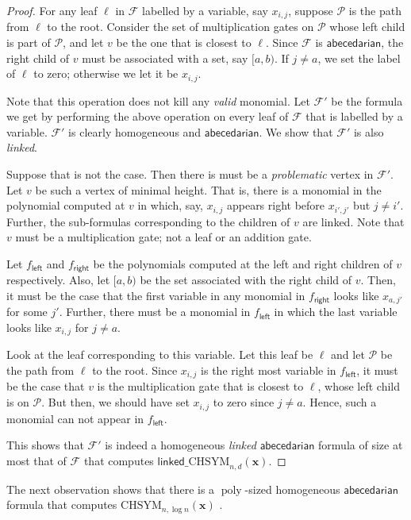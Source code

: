 \documentclass[10pt,a4paper]{article}
\def\poly{\operatorname{poly}}
\def\vecx{\mathbf{x}}
\newcommand{\form}{\textbf{$\mathcal{F}$}}
\renewcommand{\l}{\mathsf{left}}
\renewcommand{\r}{\mathsf{right}}
\newcommand{\abcd}{\mathsf{abecedarian}}
\newcommand{\chsym}[2]{\mathrm{CHSYM}_{#1,#2}}
\newcommand{\lchsym}[2]{\mathrm{\mathsf{linked}\_CHSYM}_{#1,#2}}
\begin{document}
\begin{proof}
	For any leaf $\ell$ in $\form$ labelled by a variable, say $x_{i,j}$, suppose $\mathcal{P}$ is the path from $\ell$ to the root. 
	Consider the set of multiplication gates on $\mathcal{P}$ whose left child is part of $\mathcal{P}$, and let $v$ be the one that is closest to $\ell$.
	Since $\form$ is $\abcd$, the right child of $v$ must be associated with a set, say $[a,b)$.
	If $j \neq a$, we set the label of $\ell$ to zero; otherwise we let it be $x_{i,j}$.
	
	Note that this operation does not kill any \emph{valid} monomial.
	Let $\form'$ be the formula we get by performing the above operation on every leaf of $\form$ that is labelled by a variable.
	$\form'$ is clearly 
	homogeneous and $\abcd$.
	We show that $\form'$ is also \emph{linked}.
	
	Suppose that is not the case.
	Then there is must be a \emph{problematic} vertex in $\form'$.
	Let $v$ be such a vertex of minimal height.
	That is, there is a monomial in the polynomial computed at $v$ in which, say, $x_{i,j}$ appears right before $x_{i',j'}$ but $j \neq i'$.
	Further, the sub-formulas corresponding to the children of $v$ are linked.
	Note that $v$ must be a multiplication gate; not a leaf or an addition gate.

	Let $f_\l$ and $f_\r$ be the polynomials computed at the left and right children of $v$ respectively.
	Also, let $[a,b)$ be the set associated with the right child of $v$.
	Then, it must be the case that the first variable in any monomial in $f_\r$ looks like $x_{a,j'}$ for some $j'$.
	Further, there must be a monomial in $f_\l$ in which the last variable looks like $x_{i,j}$ for $j \neq a$.
	
	Look at the leaf corresponding to this variable.
	Let this leaf be $\ell$ and let $\mathcal{P}$ be the path from $\ell$ to the root.
	Since $x_{i,j}$ is the right most variable in $f_\l$, it must be the case that $v$ is the multiplication gate that is closest to $\ell$, whose left child is on $\mathcal{P}$.
	But then, we should have set $x_{i,j}$ to zero since $j \neq a$.
	Hence, such a monomial can not appear in $f_\l$.

	This shows that $\form'$ is indeed a homogeneous \emph{linked} $\abcd$ formula of size at most that of $\form$ that computes $\lchsym{n}{d}(\vecx)$.
\end{proof}

\noindent The next observation shows that there is a $\poly$-sized homogeneous $\abcd$ formula that computes $\chsym{n}{\log n}(\vecx)$ .
\end{document}

